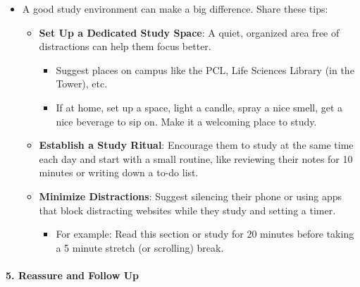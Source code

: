 \documentclass[
]{article}
\providecommand{\tightlist}{%
  \setlength{\itemsep}{0pt}\setlength{\parskip}{0pt}}
\begin{document}
\begin{itemize}
\tightlist
\item
  A good study environment can make a big difference. Share these tips:

  \begin{itemize}
  \tightlist
  \item
    \textbf{Set Up a Dedicated Study Space}: A quiet, organized area free of distractions can help them focus better.

    \begin{itemize}
    \tightlist
    \item
      Suggest places on campus like the PCL, Life Sciences Library (in the Tower), etc.
    \item
      If at home, set up a space, light a candle, spray a nice smell, get a nice beverage to sip on. Make it a welcoming place to study.
    \end{itemize}
  \item
    \textbf{Establish a Study Ritual}: Encourage them to study at the same time each day and start with a small routine, like reviewing their notes for 10 minutes or writing down a to-do list.
  \item
    \textbf{Minimize Distractions}: Suggest silencing their phone or using apps that block distracting websites while they study and setting a timer.

    \begin{itemize}
    \tightlist
    \item
      For example: Read this section or study for 20 minutes before taking a 5 minute stretch (or scrolling) break.
    \end{itemize}
  \end{itemize}
\end{itemize}

\hypertarget{reassure-and-follow-up}{%
\paragraph*{5. Reassure and Follow Up}\label{reassure-and-follow-up}}
\end{document}

